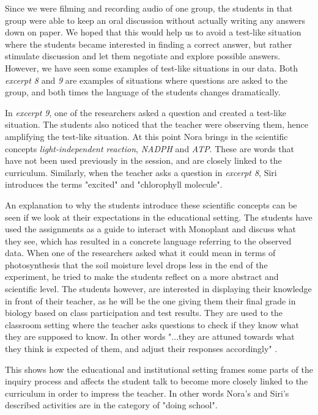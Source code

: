 Since we were filming and recording audio of one group, the students in that group were able to keep an oral discussion without actually writing any answers down on paper. We hoped that this would help us to avoid a test-like situation where the students became interested in finding a correct answer, but rather stimulate discussion and let them negotiate and explore possible answers. However, we have seen some examples of test-like situations in our data. Both \emph{excerpt 8} and \emph{9} are examples of situations where questions are asked to the group, and both times the language of the students changes dramatically. 

In \emph{excerpt 9}, one of the researchers asked a question and created a test-like situation. The students also noticed that the teacher were observing them, hence amplifying the test-like situation. At this point Nora brings in the scientific concepts \emph{light-independent reaction}, \emph{NADPH} and \emph{ATP}. These are words that have not been used previously in the session, and are closely linked to the curriculum. Similarly, when the teacher asks a question in \emph{excerpt 8}, Siri introduces the terms "excited" and "chlorophyll molecule".

An explanation to why the students introduce these scientific concepts can be seen if we look at their expectations in the educational setting. The students have used the assignments as a guide to interact with Monoplant and discuss what they see, which has resulted in a concrete language referring to the observed data. When one of the researchers asked what it could mean in terms of photosynthesis that the soil moisture level drops less in the end of the experiment, he tried to make the students reflect on a more abstract and scientific level. The students however, are interested in displaying their knowledge in front of their teacher, as he will be the one giving them their final grade in biology based on class participation and test results. They are used to the classroom setting where the teacher asks questions to check if they know what they are supposed to know. In other words "...they are attuned towards what they think is expected of them, and adjust their responses accordingly" \citep[p. 407]{furberg2009socio}. 

This shows how the educational and institutional setting frames some parts of the inquiry process and affects the student talk to become more closely linked to the curriculum in order to impress the teacher. In other words Nora's and Siri's described activities are in the category of "doing school".


